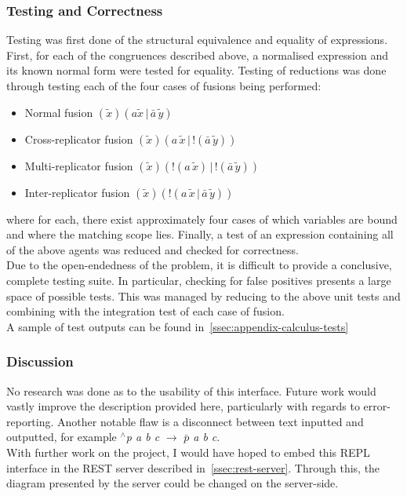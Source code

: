     \subsubsection{Testing and Correctness}\label{sssec:repl-testing}
        Testing was first done of the structural equivalence and equality of expressions.
        First, for each of the congruences described above, a normalised expression and its known normal form were tested for equality.
        Testing of reductions was done through testing each of the four cases of fusions being performed:
        \begin{itemize}
            \item Normal fusion $(\tilde{x})(a \tilde{x} \,|\, \bar{a} \, \tilde{y})$
            \item Cross-replicator fusion $(\tilde{x})(a \, \tilde{x} \,|\, !(\bar{a} \, \tilde{y}))$
            \item Multi-replicator fusion $(\tilde{x})(!(a \, \tilde{x}) \,|\, !(\bar{a} \, \tilde{y}))$
            \item Inter-replicator fusion $(\tilde{x})(!(a \, \tilde{x} \,|\, \bar{a} \, \tilde{y}))$
        \end{itemize} 
        where for each, there exist approximately four cases of which variables are bound and where the matching scope lies.
        Finally, a test of an expression containing all of the above agents was reduced and checked for correctness. \\ %

        Due to the open-endedness of the problem, it is difficult to provide a conclusive, complete testing suite.
        In particular, checking for false positives presents a large space of possible tests.
        This was managed by reducing to the above unit tests and combining with the integration test of each case of fusion.\\

        A sample of test outputs can be found in~\ref{ssec:appendix-calculus-tests}


    \subsubsection{Discussion}
        No research was done as to the usability of this interface.
        Future work would vastly improve the description provided here, particularly with regards to error-reporting.
        Another notable flaw is a disconnect between text inputted and outputted, for example \textit{$^{\wedge}$p a b c} $\rightarrow$ \textit{$\bar{p}$ a b c}.\\

        With further work on the project, I would have hoped to embed this REPL interface in the REST server described in~\ref{ssec:rest-server}.
        Through this, the diagram presented by the server could be changed on the server-side.
